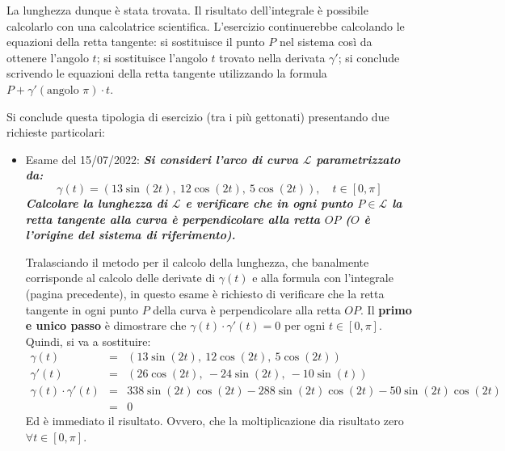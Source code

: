 \documentclass[a4paper]{article}
\begin{document}
	La lunghezza dunque è stata trovata. Il risultato dell'integrale è possibile calcolarlo con una calcolatrice scientifica. L'esercizio continuerebbe calcolando le equazioni della retta tangente: si sostituisce il punto $P$ nel sistema così da ottenere l'angolo $t$; si sostituisce l'angolo $t$ trovato nella derivata $\gamma'$; si conclude scrivendo le equazioni della retta tangente utilizzando la formula $P + \gamma'\left(\text{angolo }\pi\right) \cdot t$.\newpage

	\noindent
	Si conclude questa tipologia di esercizio (tra i più gettonati) presentando due richieste particolari:
	\begin{itemize}
		\item Esame del 15/07/2022: \textcolor{Green4}{\textbf{\emph{Si consideri l'arco di curva $\mathcal{L}$ parametrizzato da:}}
		\begin{equation*}
			\gamma\left(t\right) = \left(13\sin\left(2t\right), \: 12\cos\left(2t\right), \: 5\cos\left(2t\right)\right), \hspace{1em} t \in \left[0, \pi\right]
		\end{equation*}
		\textbf{\emph{Calcolare la lunghezza di $\mathcal{L}$ e verificare che in ogni punto $P \in \mathcal{L}$ la retta tangente alla curva è perpendicolare alla retta $OP$ ($O$ è l'origine del sistema di riferimento).}}}

		Tralasciando il metodo per il calcolo della lunghezza, che banalmente corrisponde al calcolo delle derivate di $\gamma\left(t\right)$ e alla formula con l'integrale (pagina precedente), in questo esame è richiesto di verificare che la retta tangente in ogni punto $P$ della curva è perpendicolare alla retta $OP$. Il \textbf{primo e unico passo} è dimostrare che $\gamma\left(t\right) \cdot \gamma'\left(t\right) = 0$ per ogni $t \in \left[0,\pi\right]$. Quindi, si va a sostituire:
		\begin{equation*}
			\begin{array}{rcl}
				\gamma\left(t\right) &=& \left(13\sin\left(2t\right), \: 12\cos\left(2t\right), \: 5\cos\left(2t\right)\right) \\
				\gamma'\left(t\right) &=& \left(26\cos\left(2t\right), \: -24\sin\left(2t\right), \: -10\sin\left(t\right)\right) \\
				\gamma\left(t\right) \cdot \gamma'\left(t\right) &=& 338\sin\left(2t\right)\cos\left(2t\right) - 288\sin\left(2t\right)\cos\left(2t\right) - 50 \sin\left(2t\right)\cos\left(2t\right) \\
				&=& 0
			\end{array}
		\end{equation*}
		Ed è immediato il risultato. Ovvero, che la moltiplicazione dia risultato zero $\forall t \in \left[0,\pi\right]$.


\end{itemize}
\end{document}
